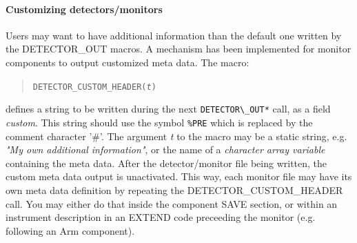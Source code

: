 %
%

\paragraph{Customizing detectors/monitors}

Users may want to have additional information than the default one written by the DETECTOR\_OUT macros. A mechanism has been implemented for monitor components to output customized meta data. The macro:

\begin{quote}
  \texttt{DETECTOR\_CUSTOM\_HEADER(\textit{t})}
\end{quote}

defines a string to be written during the next \verb+DETECTOR\_OUT*+ call, as a field \textit{custom}. This string should use the symbol \verb+%PRE+ which is replaced by
the comment character '\#'. The argument \textit{t} to the macro may be a static string, e.g. \textit{"My own additional information"}, or the name of a \textit{character array variable} containing the meta data. After
the detector/monitor file being written, the custom meta data output is unactivated. This way, each monitor file may have its own meta data definition by repeating the
DETECTOR\_CUSTOM\_HEADER call. You may either do that inside the component SAVE section, or within an instrument description in an EXTEND code preceeding the monitor (e.g.
following an Arm component).

